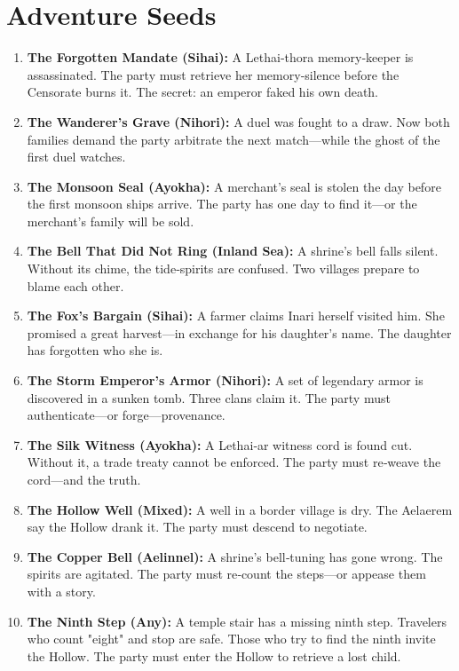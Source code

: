 \documentclass[12pt]{book}
\begin{document}
\chapter{Adventure Seeds}
\begin{enumerate}
    \item \textbf{The Forgotten Mandate (Sihai):} A Lethai‑thora memory‑keeper is assassinated. The party must retrieve her memory‑silence before the Censorate burns it. The secret: an emperor faked his own death.
    \item \textbf{The Wanderer's Grave (Nihori):} A duel was fought to a draw. Now both families demand the party arbitrate the next match---while the ghost of the first duel watches.
    \item \textbf{The Monsoon Seal (Ayokha):} A merchant's seal is stolen the day before the first monsoon ships arrive. The party has one day to find it---or the merchant's family will be sold.
    \item \textbf{The Bell That Did Not Ring (Inland Sea):} A shrine's bell falls silent. Without its chime, the tide‑spirits are confused. Two villages prepare to blame each other.
    \item \textbf{The Fox's Bargain (Sihai):} A farmer claims Inari herself visited him. She promised a great harvest---in exchange for his daughter's name. The daughter has forgotten who she is.
    \item \textbf{The Storm Emperor's Armor (Nihori):} A set of legendary armor is discovered in a sunken tomb. Three clans claim it. The party must authenticate---or forge---provenance.
    \item \textbf{The Silk Witness (Ayokha):} A Lethai‑ar witness cord is found cut. Without it, a trade treaty cannot be enforced. The party must re‑weave the cord---and the truth.
    \item \textbf{The Hollow Well (Mixed):} A well in a border village is dry. The Aelaerem say the Hollow drank it. The party must descend to negotiate.
    \item \textbf{The Copper Bell (Aelinnel):} A shrine's bell‑tuning has gone wrong. The spirits are agitated. The party must re‑count the steps---or appease them with a story.
    \item \textbf{The Ninth Step (Any):} A temple stair has a missing ninth step. Travelers who count "eight" and stop are safe. Those who try to find the ninth invite the Hollow. The party must enter the Hollow to retrieve a lost child.
\end{enumerate}
\end{document}
